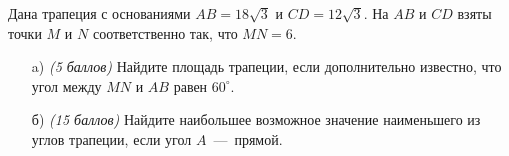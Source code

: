 
Дана трапеция с основаниями $AB = 18\sqrt{3}$ и $CD = 12\sqrt{3}$.
На $AB$ и $CD$ взяты точки $M$ и $N$
соответственно так, что $MN = 6$.

\begin{enumerate}
    \item[a)] \textit{(5 баллов)} Найдите площадь трапеции, если дополнительно известно, что угол между $MN$
    и $AB$ равен $60^\circ$.
    \item[б)] \textit{(15 баллов)} Найдите наибольшее возможное значение наименьшего из углов трапеции,
    если угол $A$~---~прямой.
    
    \end{enumerate}